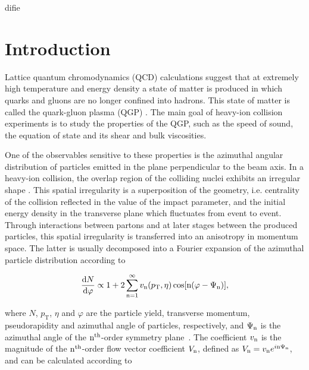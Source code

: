 difie\section{Introduction}
\label{Sec:Introduction}

Lattice quantum chromodynamics (QCD) calculations \cite{Borsanyi:2010cj,Bhattacharya:2014ara} suggest that at extremely high temperature and energy density a state of matter is produced in which quarks and gluons are no longer confined into hadrons. This state of matter is called the quark-gluon plasma (QGP) \cite{Shuryak:1984nq, Cleymans:1985wb, Bass:1998vz}. The main goal of heavy-ion collision experiments is to study the properties of the QGP, such as the speed of sound, the equation of state and its shear and bulk viscosities.

One of the observables sensitive to these properties is the azimuthal angular distribution of particles emitted in the plane perpendicular to the beam axis. In a heavy-ion collision, the overlap region of the colliding nuclei exhibits an irregular shape \cite{Miller:2003kd,Bhalerao:2006tp, Alver:2008zza, Alver:2010gr, Alver:2010dn, Manly:2005zy, Voloshin:2006gz}. This spatial irregularity is a superposition of the geometry, i.e. centrality \cite{Adam:2015ptt} of the collision reflected in the value of the impact parameter, and the initial energy density in the transverse plane which fluctuates from event to event. Through interactions between partons and at later stages between the produced particles, this spatial irregularity is transferred into an anisotropy in momentum space. The latter is usually decomposed into a Fourier expansion of the azimuthal particle distribution \cite{Voloshin:1994mz} according to

\begin{equation}
\frac{{\rm d}N}{{\rm d}\varphi} \propto 1+2\sum_{{\rm n}=1}^{\infty} v_{\rm n}(p_{\mathrm{T}},\eta) \cos[{\rm n}(\varphi - \Psi_{\rm n})],
\label{Eq:Fourier}
\end{equation}

\noindent where $N$, $p_{\mathrm{T}}$, $\eta$ and $\varphi$ are the particle yield, transverse momentum, pseudorapidity and azimuthal angle of particles, respectively, and $\Psi_{\rm n}$ is the azimuthal angle of the ${\rm n}^{\mathrm{th}}$-order symmetry plane~\cite{Voloshin:2006gz,Bhalerao:2006tp,Alver:2008zza,Alver:2010gr,Alver:2010dn}. The coefficient $v_{\rm n}$ is the magnitude of the ${\rm n}^{\mathrm{th}}$-order flow vector coefficient $V_{\rm n}$, defined as $V_{\rm n} = v_{\rm n}e^{i{\rm n}\Psi_{\rm n}}$, and can be calculated according to 

